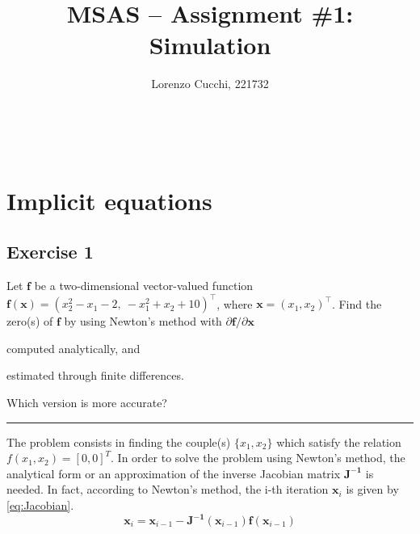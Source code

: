 \documentclass[11pt,a4paper,oneside]{article}
\title{MSAS -- Assignment \#1: Simulation} %
\author{\large {Lorenzo Cucchi}, {221732}}
\date{}
\makeatletter
\renewcommand{\vec}[1]{\mathbf{#1}}
\newcommand\headlinecolor{\normalcolor}
\renewcommand*\maketitle{%
    \begingroup
    \centering
    \fontsize{15}{15}%
    \selectfont
    \headlinecolor
    \@title\\
    \vspace{5mm}
    \@author
    \par
    \vskip1in
    \endgroup
    \vspace{-22mm}
}
\makeatother
\begin{document}
\maketitle

\thispagestyle{fancy}

\section{Implicit equations}

\subsection*{Exercise 1}

Let $\vec{f}$ be a two-dimensional vector-valued function $\vec{f}(\vec{x}) = (x_2^2-x_1-2, \ -x_1^2+x_2+10)^\top$, where $\vec{x} = (x_1, x_2)^\top$. Find the zero(s) of $\vec{f}$ by using Newton's method with $\partial\vec f/\partial\vec x$ 
\begin{enumerate*}[label=\arabic*)]
    \item computed analytically, and
    \item estimated through finite differences.
\end{enumerate*}
Which version is more accurate?

\medskip  \hrule \medskip



The problem consists in finding the couple(s) $\{x_1, x_2\}$ which satisfy the relation $f(x_1,x_2)=[0, 0]^T$. In order to solve the problem using Newton's method, the analytical form or an approximation of the inverse Jacobian matrix $\vec{J^{-1}}$ is needed. In fact, according to Newton's method, the i-th iteration $\vec{x}_{i}$ is given by \autoref{eq:Jacobian}.
\begin{equation}
    \vec{x}_{i} = \vec{x}_{i-1} - \vec{J^{-1}}(\vec{x}_{i-1}) \vec{f}(\vec{x}_{i-1})
    \label{eq:Jacobian}
\end{equation}
\end{document}
